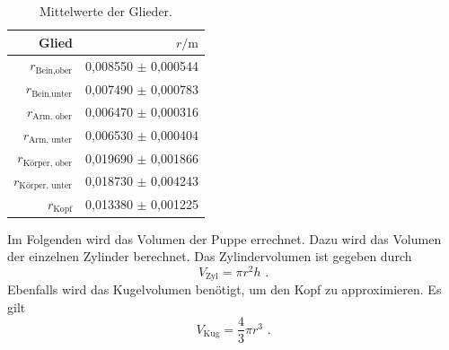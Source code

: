 
\begin{table}
  \centering
  \caption{Mittelwerte der Glieder.}
  \label{tab:MittelwertGlieder}
  \begin{tabular}{rr}
  \toprule
  Glied & $r / \unit{\meter}$ \\
  \midrule
  $r_{\text{Bein,ober}}$      & 0,008550 $\pm$ 0,000544 \\
  $r_{\text{Bein,unter}}$     & 0,007490 $\pm$ 0,000783 \\
  $r_{\text{Arm, ober}}$      & 0,006470 $\pm$ 0,000316 \\
  $r_{\text{Arm, unter}}$     & 0,006530 $\pm$ 0,000404 \\
  $r_{\text{Körper, ober}}$   & 0,019690 $\pm$ 0,001866 \\
  $r_{\text{Körper, unter}}$  & 0,018730 $\pm$ 0,004243 \\
  $r_{\text{Kopf}}$           & 0,013380 $\pm$ 0,001225 \\
  \bottomrule
\end{tabular}
\end{table}

Im Folgenden wird das Volumen der Puppe errechnet.
Dazu wird das Volumen der einzelnen Zylinder berechnet.
Das Zylindervolumen ist gegeben durch
\begin{equation*}
  V_{\text{Zyl}} = \pi r^2 h \text{ .}
\end{equation*}
Ebenfalls wird das Kugelvolumen benötigt, um den Kopf zu approximieren. Es gilt
\begin{equation*}
  V_{\text{Kug}} = \frac{4}{3} \pi r^3 \text{ .}
\end{equation*}

